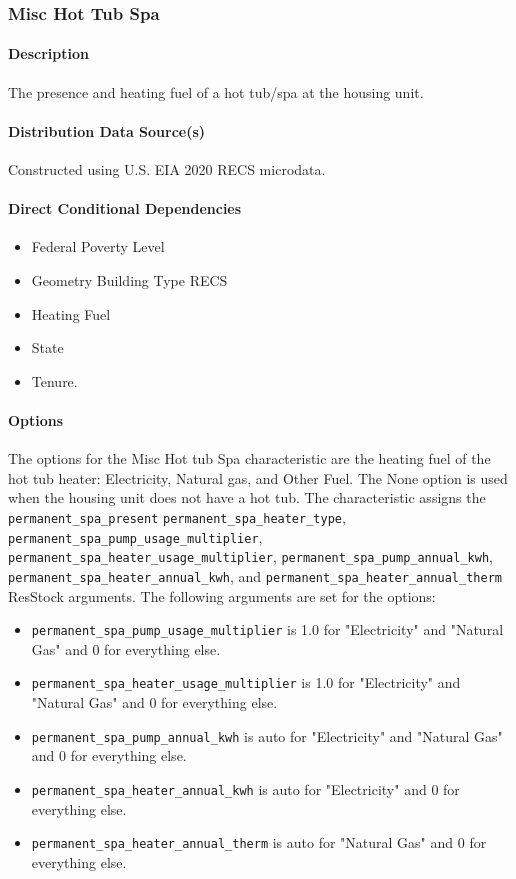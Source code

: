 \subsubsection{Misc Hot Tub Spa}
\paragraph{Description}
The presence and heating fuel of a hot tub/spa at the housing unit.

\paragraph{Distribution Data Source(s)}
Constructed using U.S. EIA 2020 RECS microdata. 

\paragraph{Direct Conditional Dependencies}
\begin{itemize}
    \item Federal Poverty Level
    \item Geometry Building Type RECS
    \item Heating Fuel
    \item State
    \item Tenure.
\end{itemize}

\paragraph{Options}
The options for the Misc Hot tub Spa characteristic are the heating fuel of the hot tub heater: Electricity, Natural gas, and Other Fuel. The None option is used when the housing unit does not have a hot tub. The characteristic assigns the \texttt{permanent\_spa\_present} \texttt{permanent\_spa\_heater\_type}, \texttt{permanent\_spa\_pump\_usage\_multiplier}, \texttt{permanent\_spa\_heater\_usage\_multiplier}, \texttt{permanent\_spa\_pump\_annual\_kwh}, \texttt{permanent\_spa\_heater\_annual\_kwh}, and \texttt{permanent\_spa\_heater\_annual\_therm} ResStock arguments. The following arguments are set for the options: 

\begin{itemize}
    \item \texttt{permanent\_spa\_pump\_usage\_multiplier} is 1.0 for "Electricity" and "Natural Gas" and 0 for everything else.
    \item \texttt{permanent\_spa\_heater\_usage\_multiplier} is 1.0 for "Electricity" and "Natural Gas" and 0 for everything else.
    \item \texttt{permanent\_spa\_pump\_annual\_kwh} is auto for "Electricity" and "Natural Gas" and 0 for everything else.
    \item \texttt{permanent\_spa\_heater\_annual\_kwh} is auto for "Electricity" and 0 for everything else.
    \item \texttt{permanent\_spa\_heater\_annual\_therm} is auto for "Natural Gas" and 0 for everything else.    
\end{itemize}

